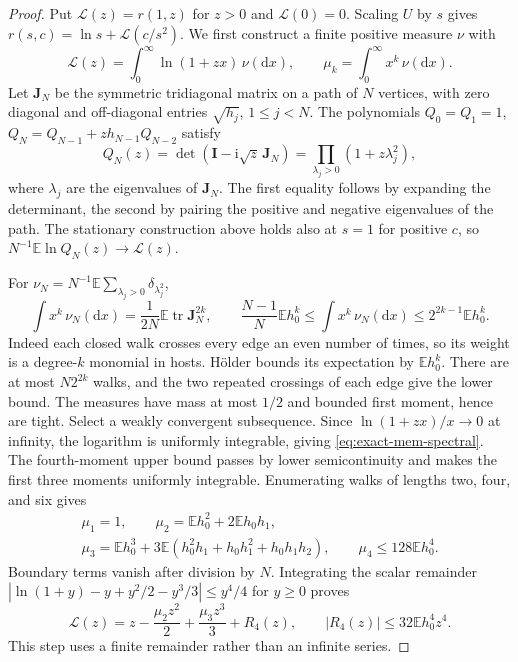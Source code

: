 \begin{proof}
Put $\mathcal L(z)=r(1,z)$ for $z>0$ and $\mathcal L(0)=0$.
Scaling $U$ by $s$ gives
$r(s,c)=\ln s+\mathcal L(c/s^2)$.
We first construct a finite positive measure $\nu$ with
\begin{equation}
 \mathcal L(z)=\int_0^\infty\ln(1+zx)\,\nu(\mathrm d x),\qquad
 \mu_k=\int_0^\infty x^k\,\nu(\mathrm d x).
 \label{eq:exact-mem-spectral}
\end{equation}
Let $\mathbf J_N$ be the symmetric tridiagonal matrix on a path of
$N$ vertices, with zero diagonal and off-diagonal entries
$\sqrt{h_j}$, $1\leq j<N$. The polynomials $Q_0=Q_1=1$,
$Q_N=Q_{N-1}+zh_{N-1}Q_{N-2}$ satisfy
\begin{equation}
 Q_N(z)=\det(\mathbf I-\mathrm i\sqrt z\,\mathbf J_N)
       =\prod_{\lambda_j>0}(1+z\lambda_j^2),
 \label{eq:exact-mem-continuant}
\end{equation}
where $\lambda_j$ are the eigenvalues of $\mathbf J_N$.
The first equality follows by expanding the determinant, the second
by pairing the positive and negative eigenvalues of the path.
The stationary construction above holds also at $s=1$ for positive
$c$, so $N^{-1}\mathbb E\ln Q_N(z)\to\mathcal L(z)$.

For $\nu_N=N^{-1}\mathbb E\sum_{\lambda_j>0}\delta_{\lambda_j^2}$,
\begin{equation}
 \int x^k\,\nu_N(\mathrm d x)
 =\frac{1}{2N}\mathbb E\operatorname{tr}\mathbf J_N^{2k},\qquad
 \frac{N-1}{N}\mathbb E h_0^k
 \leq\int x^k\,\nu_N(\mathrm d x)
 \leq2^{2k-1}\mathbb E h_0^k.
 \label{eq:exact-mem-trace}
\end{equation}
Indeed each closed walk crosses every edge an even number of times,
so its weight is a degree-$k$ monomial in hosts. H\"older bounds its
expectation by $\mathbb E h_0^k$. There are at most $N2^{2k}$ walks,
and the two repeated crossings of each edge give the lower bound.
The measures have mass at most $1/2$ and bounded first moment, hence
are tight. Select a weakly convergent subsequence.
Since $\ln(1+zx)/x\to0$ at infinity, the logarithm is uniformly
integrable, giving \eqref{eq:exact-mem-spectral}.
The fourth-moment upper bound passes by lower semicontinuity and
makes the first three moments uniformly integrable. Enumerating
walks of lengths two, four, and six gives
\begin{equation}
\begin{gathered}
 \mu_1=1,\qquad \mu_2=\mathbb E h_0^2+2\mathbb E h_0h_1,\\
 \mu_3=\mathbb E h_0^3+
 3\mathbb E(h_0^2h_1+h_0h_1^2+h_0h_1h_2),\qquad
 \mu_4\leq128\mathbb E h_0^4.
 \label{eq:exact-mem-spectral-moments}
\end{gathered}
\end{equation}
Boundary terms vanish after division by $N$.
Integrating the scalar remainder
$|\ln(1+y)-y+y^2/2-y^3/3|\leq y^4/4$ for $y\geq0$ proves
\begin{equation}
 \mathcal L(z)=z-\frac{\mu_2z^2}{2}+\frac{\mu_3z^3}{3}+R_4(z),
 \qquad |R_4(z)|\leq32\mathbb E h_0^4z^4.
 \label{eq:exact-mem-spectral-remainder}
\end{equation}
This step uses a finite remainder rather than an infinite series.


\end{proof}
